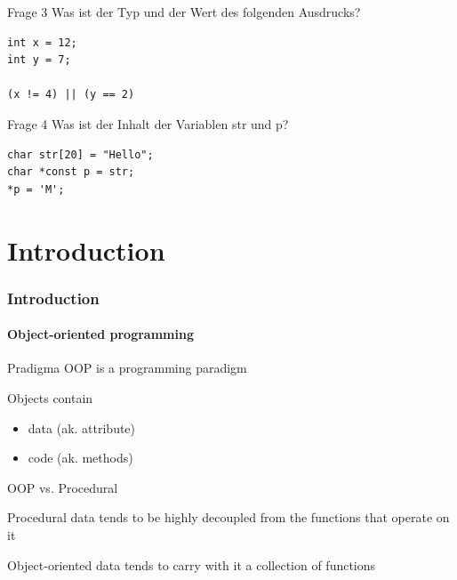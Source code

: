 \documentclass{beamer}
\begin{document}
\begin{frame}[fragile]{Frage 3}
Was ist der Typ und der Wert des folgenden Ausdrucks?
\begin{lstlisting}
int x = 12;
int y = 7;

(x != 4) || (y == 2)
\end{lstlisting}
\end{frame}

\begin{frame}[fragile]{Frage 4}
Was ist der Inhalt der Variablen str und p?
\begin{lstlisting}
char str[20] = "Hello";
char *const p = str;
*p = 'M';
\end{lstlisting}
\end{frame}

\part{Introduction}

\section{Introduction}

\subsection{Object-oriented programming}

\begin{frame}{Pradigma}
OOP is a programming paradigm
\begin{block}{Objects contain}
\begin{itemize}
\item data (ak. attribute)
\item code (ak. methods)
\end{itemize}
\end{block}
\end{frame}

\begin{frame}{OOP vs. Procedural}

\begin{block}{Procedural}
data tends to be highly decoupled from the functions that operate on it
\end{block}

\begin{block}{Object-oriented}
data tends to carry with it a collection of functions
\end{block}

\end{frame}
\end{document}
